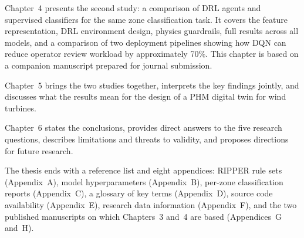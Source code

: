 Chapter~4 presents the second study: a comparison of DRL agents and supervised
classifiers for the same zone classification task. It covers the feature representation,
DRL environment design, physics guardrails, full results across all models, and a
comparison of two deployment pipelines showing how DQN can reduce operator review
workload by approximately 70\%. This chapter is based on a companion manuscript prepared
for journal submission.

Chapter~5 brings the two studies together, interprets the key findings jointly, and
discusses what the results mean for the design of a PHM digital twin for wind turbines.

Chapter~6 states the conclusions, provides direct answers to the five research questions,
describes limitations and threats to validity, and proposes directions for future
research.

The thesis ends with a reference list and eight appendices: RIPPER rule sets (Appendix~A), model hyperparameters (Appendix~B),
per-zone classification reports (Appendix~C), a glossary of key terms (Appendix~D),
source code availability (Appendix~E), research data information (Appendix~F), and the
two published manuscripts on which Chapters~3 and~4 are based (Appendices~G and~H).
